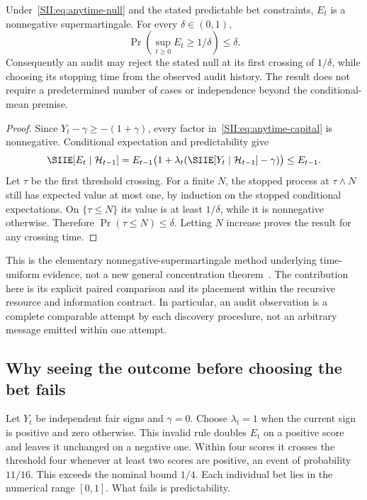 \begin{SIItheorem}\label{SII:thm:anytime}
Under~\eqref{SII:eq:anytime-null} and the stated predictable bet constraints, $E_t$ is a nonnegative supermartingale. For every $\delta\in(0,1)$,
\[
\Pr\left(\sup_{t\geq0}E_t\geq1/\delta\right)\leq\delta.
\]
Consequently an audit may reject the stated null at its first crossing of $1/\delta$, while choosing its stopping time from the observed audit history. The result does not require a predetermined number of cases or independence beyond the conditional-mean premise.
\end{SIItheorem}
\begin{proof}
Since $Y_t-\gamma\geq-(1+\gamma)$, every factor in~\eqref{SII:eq:anytime-capital} is nonnegative. Conditional expectation and predictability give
\[
\SIIE[E_t\mid\mathcal H_{t-1}]
=E_{t-1}\bigl(1+\lambda_t(\SIIE[Y_t\mid\mathcal H_{t-1}]-\gamma)\bigr)
\leq E_{t-1}.
\]
Let $\tau$ be the first threshold crossing. For a finite $N$, the stopped process at $\tau\wedge N$ still has expected value at most one, by induction on the stopped conditional expectations. On $\{\tau\leq N\}$ its value is at least $1/\delta$, while it is nonnegative otherwise. Therefore $\Pr(\tau\leq N)\leq\delta$. Letting $N$ increase proves the result for any crossing time.
\end{proof}

This is the elementary nonnegative-supermartingale method underlying time-uniform evidence, not a new general concentration theorem~\cite{SII:howard}. The contribution here is its explicit paired comparison and its placement within the recursive resource and information contract. In particular, an audit observation is a complete comparable attempt by each discovery procedure, not an arbitrary message emitted within one attempt.

\subsection{Why seeing the outcome before choosing the bet fails}
\begin{SIIcounterexample}\label{SII:ex:hindsight-bet}
Let $Y_t$ be independent fair signs and $\gamma=0$. Choose $\lambda_t=1$ when the current sign is positive and zero otherwise. This invalid rule doubles $E_t$ on a positive score and leaves it unchanged on a negative one. Within four scores it crosses the threshold four whenever at least two scores are positive, an event of probability $11/16$. This exceeds the nominal bound $1/4$. Each individual bet lies in the numerical range $[0,1]$. What fails is predictability.
\end{SIIcounterexample}

